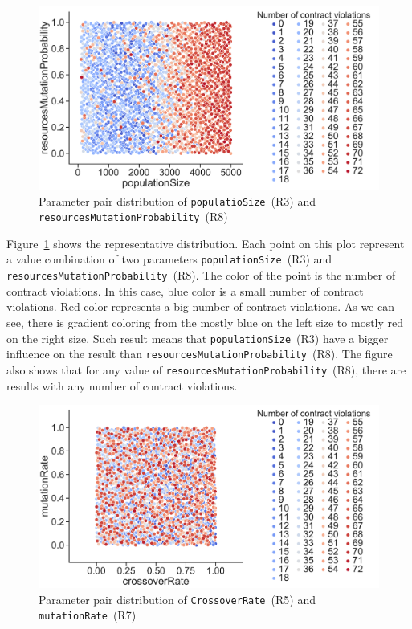 \begin{figure}
	\centering
	\includegraphics[width=\textwidth]{images/populatioSizeVsResMutationProbability.pdf}
	\caption[Parameter pair distribution of \texttt{populatioSize}~(R3) and \texttt{re\-so\-ur\-ces\-Mu\-ta\-ti\-on\-Pro\-ba\-bi\-li\-ty}~(R8)]{Parameter pair distribution of \texttt{populatioSize}~(R3) and \texttt{re\-so\-ur\-ces\-Mu\-ta\-ti\-on\-Pro\-ba\-bi\-li\-ty}~(R8)}
	\label{fig:populatioSizeVsResMutationProbability}
\end{figure}

Figure~\ref{fig:populatioSizeVsResMutationProbability} shows the representative distribution. Each point on this plot represent a value combination of two parameters \texttt{populationSize}~(R3) and \texttt{re\-so\-ur\-ces\-Mu\-ta\-ti\-on\-Pro\-ba\-bi\-li\-ty}~(R8). The color of the point is the number of contract violations. In this case, blue color is a small number of contract violations. Red color represents a big number of contract violations. As we can see, there is gradient coloring from the mostly blue on the left size to mostly red on the right size. Such result means that \texttt{po\-pu\-la\-ti\-on\-Si\-ze}~(R3) have a bigger influence on the result than \texttt{re\-so\-ur\-ces\-Mu\-ta\-ti\-on\-Pro\-ba\-bi\-li\-ty}~(R8). The figure also shows that for any value of \texttt{re\-so\-ur\-ces\-Mu\-ta\-ti\-on\-Pro\-ba\-bi\-li\-ty}~(R8), there are results with any number of contract violations.

\begin{figure}
	\centering
	\includegraphics[width=\textwidth]{images/CrossoverRateVsutationRate.pdf}
	\caption[Parameter pair distribution of \texttt{CrossoverRate}~(R5) and \texttt{mutationRate}~(R7)]{Parameter pair distribution of \texttt{CrossoverRate}~(R5) and \texttt{mutationRate}~(R7)}
	\label{fig:CrossoverRateVsMutationRate}
\end{figure}

